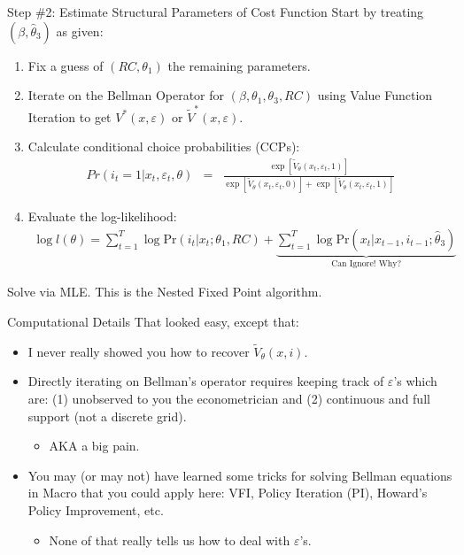 \documentclass[xcolor=pdftex,dvipsnames,table,mathserif]{beamer}
\begin{document}
\begin{frame}{Step \#2: Estimate Structural Parameters of Cost Function}
Start by treating $(\beta, \hat \theta_3)$ as given:
\begin{enumerate}
\item Fix a guess of $(RC,\theta_1)$ the remaining parameters. 
\item Iterate on the Bellman Operator for $(\beta,\theta_1,\theta_3,RC)$ using \alert{Value Function Iteration} to get $V^*(x,\varepsilon)$ or $\tilde V^*(x,\varepsilon)$.
\item Calculate \alert{conditional choice probabilities} (CCPs):
\begin{eqnarray*}
Pr(i_t=1 | x_t,\varepsilon_t,\theta) &=&  \frac {\exp[ \tilde V_{\theta} (x_t, \varepsilon_t, 1)]  }{\exp[\tilde  V_{\theta} (x_t, \varepsilon_t, 0)] + \exp[ \tilde  V_{\theta} (x_t, \varepsilon_t, 1)]} 
\end{eqnarray*} 
\item Evaluate the log-likelihood:
\begin{eqnarray*}
\log l(\theta) = \sum^T_{t=1} \log \text{Pr} (i_t | x_t ; \theta_1,RC) + \underbrace{\sum^T_{t=1} \log \text{Pr} (x_t | x_{t-1}, i_{t-1}; \hat{\theta}_3)}_{\text{Can Ignore! Why?}}
\end{eqnarray*}
\end{enumerate}
Solve via MLE. This is the \alert{Nested Fixed Point} algorithm.
\end{frame}

\begin{frame}{Computational Details}
That looked easy, except that:
\begin{itemize}
\item I never really showed you how to recover $\tilde{V}_{\theta}(x,i)$.
\item Directly iterating on Bellman's operator requires keeping track of $\varepsilon$'s which are: (1) unobserved to you the econometrician and (2) continuous and full support (not a discrete grid).
\begin{itemize}
\item AKA a big pain.
\end{itemize}
\item You may (or may not) have learned some tricks for solving Bellman equations in Macro that you could apply here: VFI, Policy Iteration (PI), Howard's Policy Improvement, etc.
\begin{itemize}
\item None of that really tells us how to deal with $\varepsilon$'s.
\end{itemize}
\end{itemize}
\end{frame}
\end{document}
